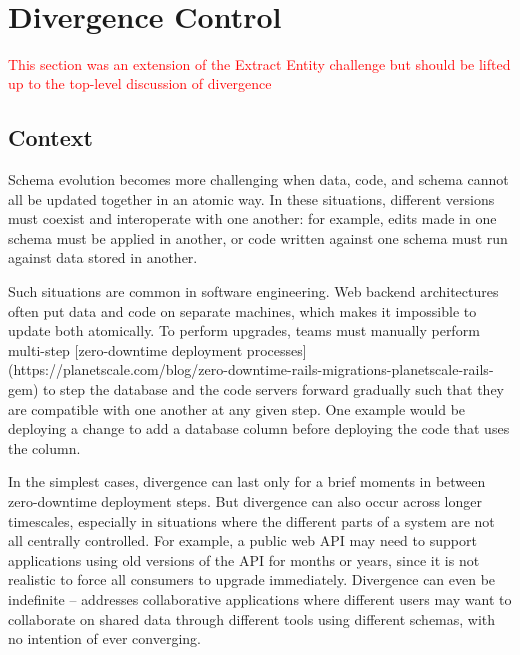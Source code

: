 \documentclass[english,submission]{programming}
\begin{document}
\newpage
~
\newpage







\section{Divergence Control}

\textcolor{red}{This section was an extension of the Extract Entity challenge but should be lifted up to the top-level discussion of divergence}

\subsection{Context}
Schema evolution becomes more challenging when data, code, and schema cannot all be updated together in an atomic way. In these situations, different versions must coexist and interoperate with one another: for example, edits made in one schema must be applied in another, or code written against one schema must run against data stored in another.

Such situations are common in software engineering. Web backend architectures often put data and code on separate machines, which makes it impossible to update both atomically. To perform upgrades, teams must manually perform multi-step [zero-downtime deployment processes](https://planetscale.com/blog/zero-downtime-rails-migrations-planetscale-rails-gem) to step the database and the code servers forward gradually such that they are compatible with one another at any given step. One example would be deploying a change to add a database column before deploying the code that uses the column.

In the simplest cases, divergence can last only for a brief moments in between zero-downtime deployment steps. But divergence can also occur across longer timescales, especially in situations where the different parts of a system are not all centrally controlled. For example, a public web API may need to support applications using old versions of the API for months or years, since it is not realistic to force all consumers to upgrade immediately. Divergence can even be indefinite -- \citet{Cambria} addresses collaborative applications where different users may want to collaborate on shared data through different tools using different schemas, with no intention of ever converging.
\end{document}
